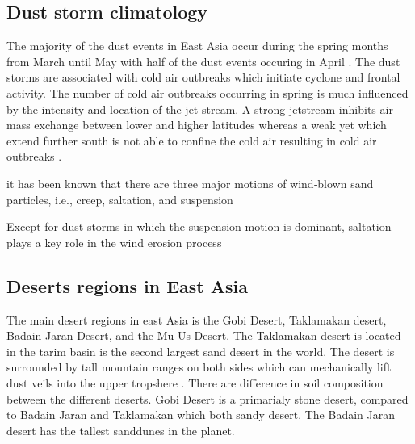 \subsection{Dust storm climatology}
The majority of the dust events in East Asia occur during the spring months from March until May with half of the dust events occuring in April \parencite{sun2001spatial}. The dust storms are associated with cold air outbreaks which initiate cyclone and frontal activity. The number of cold air outbreaks occurring in spring is much influenced by the intensity and location of the jet stream. A strong jetstream inhibits air mass exchange between lower and higher latitudes whereas a weak yet which extend further south is not able to confine the cold air resulting in cold air outbreaks \parencite{wang2008variability}.   

it has been known that there are three major motions of wind‐blown sand particles, i.e., creep, saltation, and suspension

Except for dust storms in which the suspension motion is dominant, saltation plays a key role in the wind erosion process
\subsection{Deserts regions in East Asia}
The main desert regions in east Asia is the Gobi Desert, Taklamakan desert, Badain Jaran Desert,  and the Mu Us Desert. The Taklamakan desert is located in the tarim basin is the second largest sand desert in the world. The desert is surrounded by tall mountain ranges on both sides which can mechanically lift dust veils into the upper tropshere \parencite{yumimoto_elevated_2009}.   There are difference in soil composition between the different deserts. Gobi Desert is a primarialy stone desert, compared to Badain Jaran and Taklamakan which both sandy desert. The Badain Jaran desert has the tallest sanddunes in the planet. 



